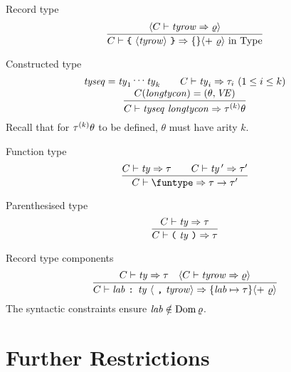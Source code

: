 \begin{inference-rule}{Record type}
\begin{equation}\label{rule:static-core:record-type}
  \vcenter{\infer{\C\ts\lttbrace\ \rectype\ \rttbrace\ra\emptymap\optional{ +\ \varrho}\ \In\ \Type}
    {\optional{\C\ts\labtys\ra\varrho}}}
\end{equation}
\end{inference-rule}

\begin{inference-rule}{Constructed type}
\begin{equation}\label{rule:static-core:constructed-type}
  \vcenter{\infer{\C\ts\constype\ra\tauk\theta}
    {\deduce{\C(\longtycon)=(\theta,\VE)}
      {\tyseq=\ty_{1}\syndots\ty_{k}\qquad\C\ts\ty_{i}\ra\tau_{i}\ (1\leq i\leq k)}}}
\end{equation}
Recall that for $\mbox{$\tau^{(k)}$}\theta$ to be defined, $\theta$ must have arity
$k$.
\end{inference-rule}

\begin{inference-rule}{Function type}
\begin{equation}\label{rule:static-core:function-type}
  \vcenter{\infer{\C\ts\funtype\ra\tau\to\tau'}
    {\C\ts\ty\ra\tau\qquad\C\ts\ty\,'\ra\tau'}}
\end{equation}
\end{inference-rule}

\begin{inference-rule}{Parenthesised type}
\begin{equation}\label{rule:static-core:parenthesised-type}
  \vcenter{\infer{\C\ts\partype\ra\tau}
    {\C\ts\ty\ra\tau}}
\end{equation}
\end{inference-rule}


\begin{inference-rule}{Record type components}
\begin{equation}\label{rule:static-core:record-type-components}
  \vcenter{\infer{\C\ts\longlabtys\ra\{\lab\mapsto\tau\}\optional{ +\ \varrho}}
    {\C\ts\ty\ra\tau
      & \optional{\C\ts\labtys\ra\varrho}}}
\end{equation}
The syntactic constraints ensure $\textit{lab\/}\notin\mathop{\rm Dom}\nolimits\varrho$.
\end{inference-rule}

\section{Further Restrictions}

